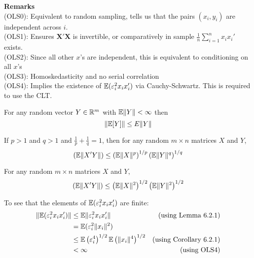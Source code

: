\documentclass[DIV=14,titlepage=false]{scrreprt}
\begin{document}
\textbf{Remarks}\\
(OLS0): Equivalent to random sampling, tells us that the pairs $(x_i,y_i)$ are independent across $i$.\\
(OLS1): Ensures $\mathbf{X'X}$ is invertible, or comparatively in sample $\frac{1}{n}\sum_{i=1}^{n}x_i x_i'$ exists.\\
(OLS2): Since all other $x$'s are independent, this is equivalent to conditioning on all $x$'s\\
(OLS3): Homoskedasticity and no serial correlation\\
(OLS4): Implies the existence of $\mathbb{E}(\varepsilon_i ^2 x_i x_i ')$ via Cauchy-Schwartz. This is required to use the CLT.\\
\begin{lemma}
    For any random vector $Y\in \mathbb{R}^m$ with $\mathbb{E} \| Y \| < \infty$ then \[ \| \mathbb{E}[Y] \| \leq E \| Y \| \]
\end{lemma}
\begin{lemma}
    If $p>1$ and $q>1$ and $\frac{1}{p} + \frac{1}{q} = 1$, then for any random $m\times n$ matrices $X$ and $Y$, \[ \left(\mathbb{E} \|X'Y\|\right) \leq \left(\mathbb{E} \|X\|^p\right)^{1/p}\left(\mathbb{E} \|Y\|^q\right)^{1/q}\]
\end{lemma}
\begin{corollary}
    For any random $m\times n$ matrices $X$ and $Y$, \[ \left(\mathbb{E} \|X'Y\|\right) \leq \left(\mathbb{E} \|X\|^2\right)^{1/2}\left(\mathbb{E} \|Y\|^2\right)^{1/2}\]
\end{corollary}

To see that the elements of $\mathbb{E}(\varepsilon_i ^2 x_i x_i ')$ are finite:
\begin{align*}
    \| \mathbb{E}(\varepsilon_i ^2 x_i x_i ') \| &\leq \mathbb{E} \|\varepsilon_i ^2 x_i x_i '\| &\text{(using Lemma 6.2.1)}\\
    &= \mathbb{E}(\varepsilon_i ^2 \|x_i\|^2)&\\
    &\leq \mathbb{E}\left(\varepsilon_i ^4\right)^{1/2} \mathbb{E}\left( \|x_i\|^4\right)^{1/2} &\text{(using Corollary 6.2.1)}\\
    &< \infty &\text{(using OLS4)}
\end{align*}
\end{document}

